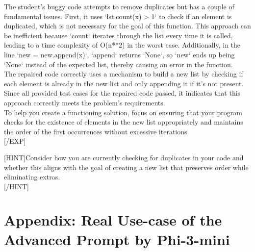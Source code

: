 \documentclass{article}
\begin{document}
\begin{figure*}[h!]
    \centering
    \begin{tcolorbox}[colframe=black!10!white, colback=black!5!white]
        \begin{minipage}{\textwidth}
            \ttfamily
            [EXP]The student's buggy code attempts to remove duplicates but has a couple of fundamental issues. First, it uses `lst.count(x) > 1` to check if an element is duplicated, which is not necessary for the goal of this function. This approach can be inefficient because `count` iterates through the list every time it is called, leading to a time complexity of O(n**2) in the worst case. Additionally, in the line `new = new.append(x)`, `append` returns `None`, so `new` ends up being `None` instead of the expected list, thereby causing an error in the function.\\ 

            The repaired code correctly uses a mechanism to build a new list by checking if each element is already in the new list and only appending it if it's not present. Since all provided test cases for the repaired code passed, it indicates that this approach correctly meets the problem's requirements.\\

            To help you create a functioning solution, focus on ensuring that your program checks for the existence of elements in the new list appropriately and maintains the order of the first occurrences without excessive iterations.\texttt{\\}
            [/EXP]
            \texttt{\\}

            [HINT]Consider how you are currently checking for duplicates in your code and whether this aligns with the goal of creating a new list that preserves order while eliminating extras.\texttt{\\}
            [/HINT]
        \end{minipage}
    \end{tcolorbox}
    \caption{Response given by GPT-4o-mini to the advanced prompt in Figure \ref{fig:real-use-case-gpt-4o-mini}.}
    \label{fig:real-use-case-gpt4o-mini-response}
\end{figure*}

\clearpage 

\section{Appendix: Real Use-case of the Advanced Prompt by Phi-3-mini}\label{appendix:real-use-case-phi-3-mini}
\end{document}
